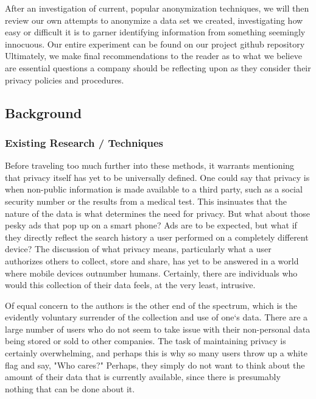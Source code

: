 \documentclass[10pt,journal,compsoc]{IEEEtran}
\begin{document}
After an investigation of current, popular anonymization techniques, we will then review our own attempts to anonymize a data set we created, investigating how easy or difficult it is to garner identifying information from something seemingly innocuous.  Our entire experiment can be found on our project github repository \cite{frye}  Ultimately, we make final recommendations to the reader as to what we believe are essential questions a company should be reflecting upon as they consider their privacy policies and procedures.



\hfill 
 
\hfill 

\subsection{Background}


\subsubsection{Existing Research / Techniques}

	Before traveling too much further into these methods, it warrants mentioning that privacy itself has yet to be universally defined. One could say that privacy is when non-public information is made available to a third party, such as a social security number or the results from a medical test.  This insinuates that the nature of the data is what determines the need for privacy.  But what about those pesky ads that pop up on a smart phone?  Ads are to be expected, but what if they directly reflect the search history a user performed on a completely different device?  The discussion of what privacy means, particularly what a user authorizes others to collect, store and share, has yet to be answered in a world where mobile devices outnumber humans\cite{borne}. Certainly, there are individuals who would this collection of their data feels, at the very least, intrusive.
	
	Of equal concern to the authors is the other end of the spectrum, which is the evidently voluntary surrender of the collection and use of one`s data.  There are a large number of users who do not seem to take issue with their non-personal data being stored or sold to other companies.  The task of maintaining privacy is certainly overwhelming, and perhaps this is why so many users throw up a white flag and say, "Who cares?"  Perhaps, they simply do not want to think about the amount of their data that is currently available, since there is presumably nothing that can be done about it.
	
\end{document}

